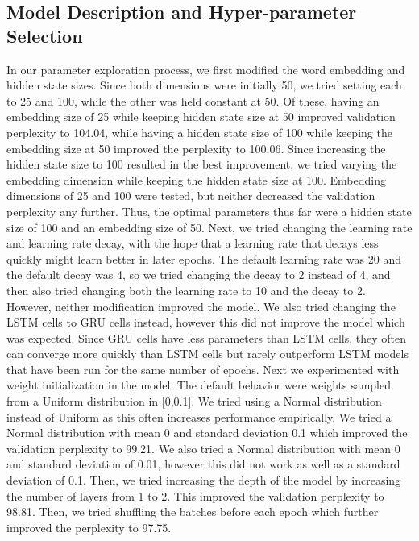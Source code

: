 \documentclass[a4paper]{article}
\begin{document}
\subsection*{Model Description and Hyper-parameter Selection}
In our parameter exploration process, we first modified the word embedding and hidden state sizes. Since both dimensions were initially 50, we tried setting each to 25 and 100, while the other was held constant at 50. Of these, having an embedding size of 25 while keeping hidden state size at 50 improved validation perplexity to 104.04, while having a hidden state size of 100 while keeping the embedding size at 50 improved the perplexity to 100.06. Since increasing the hidden state size to 100 resulted in the best improvement, we tried varying the embedding dimension while keeping the hidden state size at 100. Embedding dimensions of 25 and 100 were tested, but neither decreased the validation perplexity any further. Thus, the optimal parameters thus far were a hidden state size of 100 and an embedding size of 50. 
\newline
\newline
Next, we tried changing the learning rate and learning rate decay, with the hope that a learning rate that decays less quickly might learn better in later epochs. The default learning rate was 20 and the default decay was 4, so we tried changing the decay to 2 instead of 4, and then also tried changing both the learning rate to 10 and the decay to 2. However, neither modification improved the model. We also tried changing the LSTM cells to GRU cells instead, however this did not improve the model which was expected. Since GRU cells have less parameters than LSTM cells, they often can converge more quickly than LSTM cells but rarely outperform LSTM models that have been run for the same number of epochs.
\newline
\newline
Next we experimented with weight initialization in the model. The default behavior were weights sampled from a Uniform distribution in [0,0.1]. We tried using a Normal distribution instead of Uniform as this often increases performance empirically. We tried a Normal distribution with mean 0 and standard deviation 0.1 which improved the validation perplexity to 99.21. We also tried a Normal distribution with mean 0 and standard deviation of 0.01, however this did not work as well as a standard deviation of 0.1. Then, we tried increasing the depth of the model by increasing the number of layers from 1 to 2. This improved the validation perplexity to 98.81. Then, we tried shuffling the batches before each epoch which further improved the perplexity to 97.75.
\end{document}
